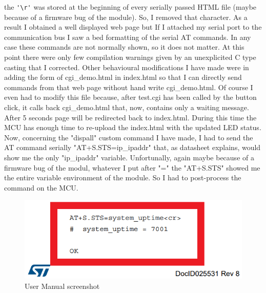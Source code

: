 \documentclass[peerreview]{IEEEtran}
\begin{document}
the \lstinline[style=CStyle]{'\r'} was stored at the beginning of every serially passed HTML file (maybe because of a firmware bug of the module). So, I removed that character. As a result I obtained a well displayed web page but If I attached my serial port to the communication bus I saw a bed formatting of the serial AT commands. In any case these commands are not normally shown, so it does not matter. At this point there were only few compilation warnings given by an unexplicited C type casting that I corrected. Other behavioural modifications I have made were in adding the form of cgi\_demo.html in index.html so that I can directly send commands from that web page without hand write cgi\_demo.html. Of course I even had to modify this file because, after test.cgi has been called by the button click, it calls back cgi\_demo.html that, now, contains only a waiting message. After 5 seconds page will be redirected back to index.html. During this time the MCU has enough time to re-upload the index.html with the updated LED status. Now, concerning the "dispall" custom command I have made, I had to send the AT command serially "AT+S.STS=ip\_ipaddr" that, as datasheet explains, would show me the only "ip\_ipaddr" variable. Unfortunally, again maybe because of a firmware bug of the modul, whatever I put after "=" the "AT+S.STS"  showed me the entire variable environment of the module. So I had to post-process the command on the MCU.
\begin{figure}[!h]
\centering
\includegraphics[width=0.51\columnwidth]{6} 
\caption{User Manual screenshot}
\label{fig_datasheet}
\end{figure}
\end{document}
